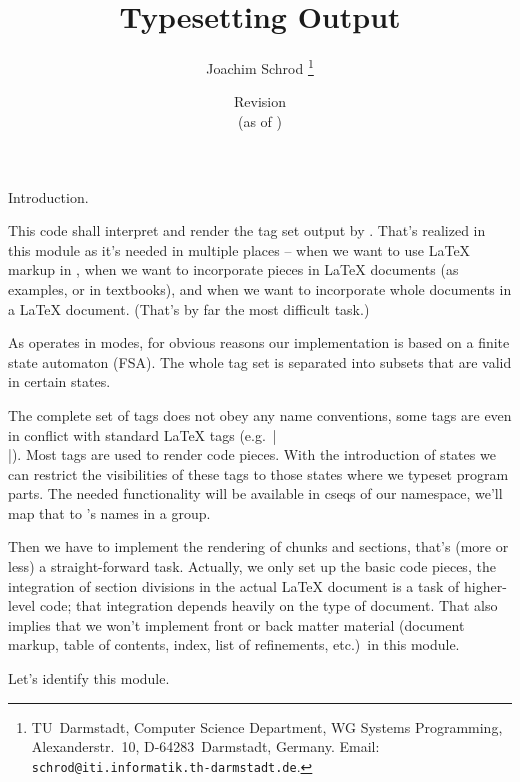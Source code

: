 \documentclass{progltx}
\begin{document}
\title{Typesetting \cweave{} Output}
\author{%
    Joachim Schrod%
    \thanks{%
	\protect\raggedright
	TU~Darmstadt, Computer Science Department, WG Systems Programming,
	Alexanderstr.~10, D-64283~Darmstadt, Germany.
	Email: \texttt{schrod@iti.informatik.th-darmstadt.de}.%
	}%
    }
\date{%
    Revision \RCSStyleRevision\\
    (as of \RCSStyleDate)%
    }

\maketitle






\chap Introduction.

This code shall interpret and render the tag set output by \cweave{}.
That's realized in this module as it's needed in multiple places --
when we want to use \LaTeX{} markup in \cweb{}, when we want to
incorporate \cweb{} pieces in \LaTeX{} documents (as examples, or in
textbooks), and when we want to incorporate whole \cweb{} documents in
a \LaTeX{} document. (That's by far the most difficult task.)

As \cweb{} operates in modes, for obvious reasons our implementation
is based on a finite state automaton (FSA). The whole tag set is
separated into subsets that are valid in certain states.

The complete set of tags does not obey any name conventions, some tags
are even in conflict with standard \LaTeX{} tags (e.g.\ |\\|). Most
tags are used to render code pieces. With the introduction of states
we can restrict the visibilities of these tags to those states where
we typeset program parts. The needed functionality will be available
in cseqs of our namespace, we'll map that to \cweave{}'s names in a
group.

Then we have to implement the rendering of chunks and sections, that's
(more or less) a straight-forward task. Actually, we only set up the
basic code pieces, the integration of section divisions in the actual
\LaTeX{} document is a task of higher-level code; that integration
depends heavily on the type of document. That also implies that we
won't implement front or back matter material (document markup, table
of contents, index, list of refinements, etc.)\ in this module.


\sect Let's identify this module.
\end{document}
